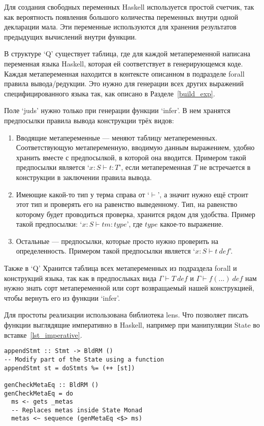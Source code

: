 Для создания свободных переменных Haskell используется простой счетчик, так как вероятность появления большого количества переменных внутри одной декларации мала. Эти переменные используются для хранения результатов предыдущих вычислений внутри функции.

В структуре `Q' существует таблица, где для каждой метапеременной написана переменная языка Haskell, которая ей соответствует в генерирующемся коде. Каждая метапеременная находится в контексте описанном в подразделе forall правила вывода/редукции. Это нужно для генерации всех других выражений специфицированного языка так, как описано в Разделе~\ref{build_exp}.

Поле `juds' нужно только при генерации функции `infer'. В нем хранятся предпосылки правила вывода конструкции трёх видов:
\begin{enumerate}
  \item Вводящие метапеременные --- меняют таблицу метапеременных. Соответствующую метапеременную, вводимую данным выражением, удобно хранить вместе с предпосылкой, в которой она вводится. Примером такой предпосылки является `$x : S \vdash t : T$', если метапеременная $T$ не встречается в конструкции в заключении правила вывода.
  \item Имеющие какой-то тип у терма справа от `$\vdash$', а значит нужно ещё строит этот тип и проверять его на равенство выведенному. Тип, на равенство которому будет проводиться проверка, хранится рядом для удобства. Пример такой предпосылки: `$x : S \vdash tm : type$', где $type$ какое-то выражение.
  \item Остальные --- предпосылки, которые просто нужно проверить на определенность. Примером такой предпосылки является `$x : S \vdash t\ def$'.
\end{enumerate}

Также в `Q' Хранится таблица всех метапеременных из подраздела forall и конструкций языка, так как в предпослыках вида $\Gamma \vdash T\ def$ и $\Gamma \vdash f(...)\ def$ нам нужно знать сорт метапеременной или сорт возвращаемый нашей конструкцией, чтобы вернуть его из функции `infer'.

Для простоты реализации использована библиотека lens\cite{lens}. Что позволяет писать функции выглядящие императивно в Haskell, например при манипуляции State во вставке~\ref{lst_imperative}.

\begin{lstlisting}[caption={Примеры ``императивного'' кода внутри монады State c использованием библиотеки lens},captionpos=b,frame=single, float, floatplacement=H, label={lst_imperative}]
appendStmt :: Stmt -> BldRM ()
-- Modify part of the State using a function
appendStmt st = doStmts %= (++ [st])

genCheckMetaEq :: BldRM ()
genCheckMetaEq = do
  ms <- gets _metas
  -- Replaces metas inside State Monad
  metas <~ sequence (genMetaEq <$> ms)
\end{lstlisting}

